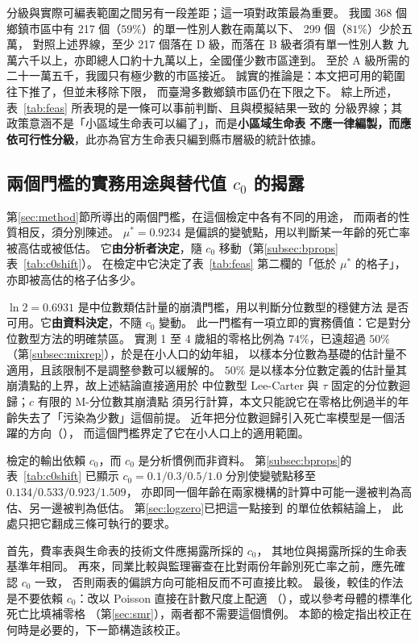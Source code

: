 \documentclass[UTF8, fontset=macnew, a4paper, 12pt]{ctexart}
\begin{document}
分級與實際可編表範圍之間另有一段差距；這一項對政策最為重要。
我國 368 個鄉鎮市區中有 217 個（$59\%$）的單一性別人數在兩萬以下、
299 個（$81\%$）少於五萬，
對照上述界線，至少 217 個落在 D 級，而落在 B 級者須有單一性別人數
九萬六千以上，亦即總人口約十九萬以上，全國僅少數市區達到。
至於 A 級所需的二十一萬五千，我國只有極少數的市區接近。
誠實的推論是：本文把可用的範圍往下推了，但並未移除下限，
而臺灣多數鄉鎮市區仍在下限之下。
綜上所述，表~\ref{tab:feas} 所表現的是一條可以事前判斷、且與模擬結果一致的
分級界線；其政策意涵不是「小區域生命表可以編了」，而是\textbf{小區域生命表
不應一律編製，而應依可行性分級}，此亦為官方生命表只編到縣市層級的統計依據。

\subsection{兩個門檻的實務用途與替代值 $c_0$ 的揭露}\label{subsec:thresholds}\label{subsec:c0disc}

第\ref{sec:method}節所導出的兩個門檻，在這個檢定中各有不同的用途，
而兩者的性質相反，須分別陳述。
$\mu^{\ast}=0.9234$ 是偏誤的變號點，用以判斷某一年齡的死亡率被高估或被低估。
它\textbf{由分析者決定}，隨 $c_0$ 移動（第\ref{subsec:bprops}表~\ref{tab:c0shift}）。
在檢定中它決定了表~\ref{tab:feas} 第二欄的「低於 $\mu^{\ast}$ 的格子」，
亦即被高估的格子佔多少。

$\ln2=0.6931$ 是中位數類估計量的崩潰門檻，用以判斷分位數型的穩健方法
是否可用。它\textbf{由資料決定}，不隨 $c_0$ 變動。
此一門檻有一項立即的實務價值：它是對分位數型方法的明確禁區。
實測 1 至 4 歲組的零格比例為 $74\%$，已遠超過 $50\%$
（第\ref{subsec:mixrep}），於是在小人口的幼年組，
以樣本分位數為基礎的估計量不適用，且該限制不是調整參數可以緩解的。
$50\%$ 是以樣本分位數定義的估計量其崩潰點的上界，故上述結論直接適用於
中位數型 Lee-Carter 與 $\tau$ 固定的分位數迴歸；$c$ 有限的 M-分位數其崩潰點
須另行計算，本文只能說它在零格比例過半的年齡失去了「污染為少數」這個前提。
近年把分位數迴歸引入死亡率模型是一個活躍的方向（\citealp{santolino2020}），
而這個門檻界定了它在小人口上的適用範圍。


檢定的輸出依賴 $c_0$，而 $c_0$ 是分析慣例而非資料。
第\ref{subsec:bprops}的表~\ref{tab:c0shift} 已顯示
$c_0=0.1/0.3/0.5/1.0$ 分別使變號點移至 $0.134/0.533/0.923/1.509$，
亦即同一個年齡在兩家機構的計算中可能一邊被判為高估、另一邊被判為低估。
第\ref{sec:logzero}已把這一點接到 \citet{chenroth2024} 的單位依賴結論上，
此處只把它翻成三條可執行的要求。

首先，費率表與生命表的技術文件應揭露所採的 $c_0$，
其地位與揭露所採的生命表基準年相同。
再來，同業比較與監理審查在比對兩份年齡別死亡率之前，應先確認 $c_0$ 一致，
否則兩表的偏誤方向可能相反而不可直接比較。
最後，較佳的作法是不要依賴 $c_0$：改以 Poisson 直接在計數尺度上配適
（\citealp{brouhns2002}），或以參考母體的標準化死亡比填補零格
（第\ref{sec:smr}），兩者都不需要這個慣例。
本節的檢定指出校正在何時是必要的，下一節構造該校正。
\end{document}
